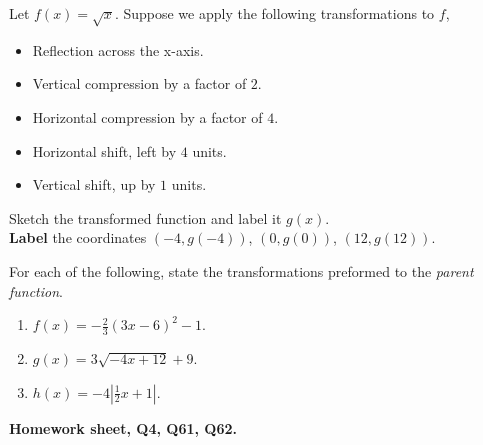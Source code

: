 \documentclass[12pt]{article} %
\begin{document}
\begin{qstn}
  Let $f(x) = \sqrt{x} $. Suppose we apply the following transformations to $f$,
  \begin{itemize}
    \item Reflection across the x-axis.
    \item Vertical compression by a factor of $2$.
    \item Horizontal compression by a factor of $4$.
    \item Horizontal shift, left by $4$ units.
    \item Vertical shift, up by $1$ units.
  \end{itemize}
  Sketch the transformed function and label it $g(x)$. 
  \\ \textbf{Label} the coordinates $(-4,g(-4))$, $(0,g(0))$, $(12,g(12))$.
  
\end{qstn}

\begin{qstn}
  For each of the following, state the transformations preformed to the \textit{parent function}.
  \begin{enumerate}[label=(\alph*)]
    \item $f(x) = -\frac{2}{3}(3x - 6)^2 - 1$.
    \item $g(x) = 3\sqrt{-4x + 12} + 9$.
    \item $h(x) = -4\left|\frac{1}{2}x + 1\right|$.
  \end{enumerate}
\end{qstn}

\begin{qstn}
  \textbf{Homework sheet, Q4, Q61, Q62.}
\end{qstn}
\end{document}
